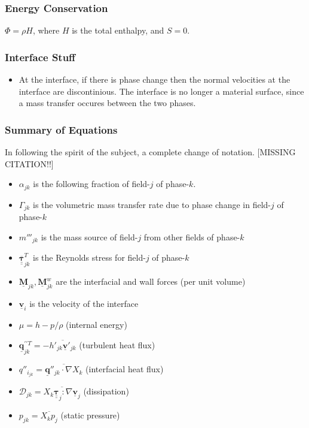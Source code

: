 \subsubsection{Energy Conservation}
$\Phi=\rho H$, where $H$ is the total enthalpy, and $S = 0$. 
\subsubsection{Interface Stuff}
\begin{itemize}
	\item At the interface, if there is phase change then the normal velocities at the interface are discontinious. The interface is no longer a material surface, since a mass transfer occures between the two phases.
\end{itemize}

\subsubsection{Summary of Equations}
In following the spirit of the subject, a complete change of notation. [MISSING CITATION!!]
\begin{itemize}
	\item $\alpha_{jk}$ is the following fraction of field-$j$ of phase-$k$.
	\item $\Gamma_{jk}$ is the volumetric mass transfer rate due to phase change in field-$j$ of phase-$k$
	\item $m'''_{jk}$ is the mass source of field-$j$ from other fields of phase-$k$
	\item $\underline{\underline{\overline{\mathbf{\tau}}}}_{jk}^T$ is the Reynolds stress for field-$j$ of phase-$k$
	\item $\underline{\mathbf{M}}_{jk}, \underline{\mathbf{M}}_{jk}^{w}$ are the interfacial and wall forces (per unit volume)
	\item $\underline{\mathbf{v}}_{i}$ is the velocity of the interface
	\item $\mu = h - p/\rho$ (internal energy)
	\item $\underline{\mathbf{q}}^{\prime \prime T}_{jk} = - \overline{h'_{jk} \underline{\mathbf{v}}'_{jk}}$ (turbulent heat flux)
	\item $q''_{i_{jk}} = \overline{\underline{\mathbf{q}}''_{jk} \cdot \nabla X_{k}}$ (interfacial heat flux)
	\item $\mathcal{D}_{jk} = \overline{X_{k} \underline{\underline{\mathbf{\tau}}}_{j} : \nabla \underline{\mathbf{v}}_{j}}$ (dissipation)
	\item $p_{jk} = \overline{X_{k} p_{j}}$ (static pressure)
\end{itemize}
